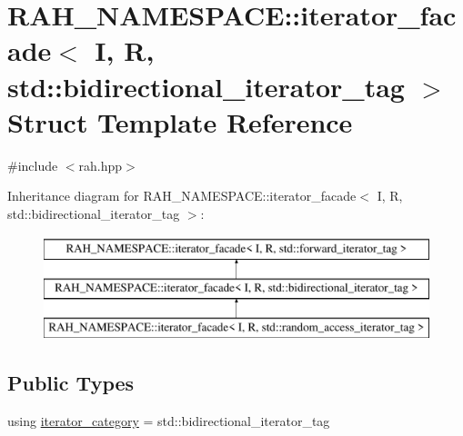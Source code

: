 \hypertarget{struct_r_a_h___n_a_m_e_s_p_a_c_e_1_1iterator__facade_3_01_i_00_01_r_00_01std_1_1bidirectional__iterator__tag_01_4}{}\section{R\+A\+H\+\_\+\+N\+A\+M\+E\+S\+P\+A\+CE\+::iterator\+\_\+facade$<$ I, R, std\+::bidirectional\+\_\+iterator\+\_\+tag $>$ Struct Template Reference}
\label{struct_r_a_h___n_a_m_e_s_p_a_c_e_1_1iterator__facade_3_01_i_00_01_r_00_01std_1_1bidirectional__iterator__tag_01_4}


{\ttfamily \#include $<$rah.\+hpp$>$}

Inheritance diagram for R\+A\+H\+\_\+\+N\+A\+M\+E\+S\+P\+A\+CE\+::iterator\+\_\+facade$<$ I, R, std\+::bidirectional\+\_\+iterator\+\_\+tag $>$\+:\begin{figure}[H]
\begin{center}
\leavevmode
\includegraphics[height=3.000000cm]{struct_r_a_h___n_a_m_e_s_p_a_c_e_1_1iterator__facade_3_01_i_00_01_r_00_01std_1_1bidirectional__iterator__tag_01_4}
\end{center}
\end{figure}
\subsection*{Public Types}
\begin{DoxyCompactItemize}
\item 
using \mbox{\hyperlink{struct_r_a_h___n_a_m_e_s_p_a_c_e_1_1iterator__facade_3_01_i_00_01_r_00_01std_1_1bidirectional__iterator__tag_01_4_a4a4bb5297faa1c67244e7d36fffb8065}{iterator\+\_\+category}} = std\+::bidirectional\+\_\+iterator\+\_\+tag
\end{DoxyCompactItemize}
